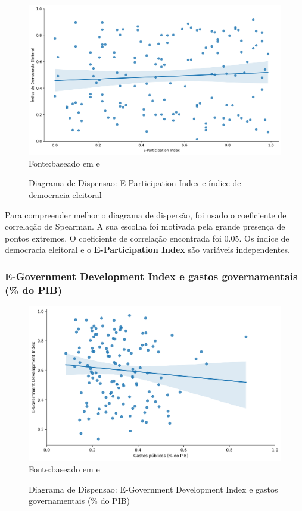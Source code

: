 \begin{figure}[H]
	\centering
	\caption{Diagrama de Dispensao: E-Participation Index e índice de democracia eleitoral}
	\includegraphics[width=1\linewidth]{figuras/egdi/dispersao_epart_indicedemocracia}
	\label{fig:dispersao_epart_indicedemocracia}
	\footnotesize{Fonte:baseado em \cite{ONU_EGDI_mapa} e \cite{electoral_democracy_index}}
\end{figure}

Para compreender melhor o diagrama de dispersão, foi usado o coeficiente de correlação de Spearman. A sua escolha foi motivada pela grande presença de pontos extremos. O coeficiente de correlação encontrada foi 0.05. Os índice de democracia eleitoral e o \textbf{E-Participation Index} são variáveis independentes.

\subsubsection{E-Government Development Index e gastos governamentais (\% do PIB)}

\begin{figure}[H]
	\centering
	\caption{Diagrama de Dispensao: E-Government Development Index e gastos governamentais (\% do PIB)}
	\includegraphics[width=1\linewidth]{figuras/egdi/dispersao_egov_govexpenditure}
	\label{fig:dispersao_egov_govexpenditure}
	\footnotesize{Fonte:baseado em \cite{ONU_EGDI_mapa} e \cite{FMI_gov_expenditure}}
\end{figure}

